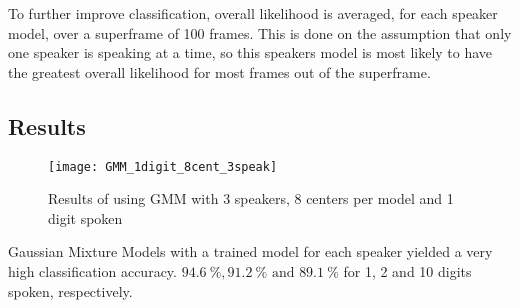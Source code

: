 To further improve classification, overall likelihood is averaged, for each speaker model, over a superframe of 100 frames.
This is done on the assumption that only one speaker is speaking at a time, so this speakers model is most likely to have the greatest overall likelihood for most frames out of the superframe.

\subsection*{Results}
\begin{figure}[H]
\centering
\texttt{[image: GMM\_1digit\_8cent\_3speak]}
\caption{Results of using GMM with 3 speakers, 8 centers per model and 1 digit spoken}
\label{fig:GMM_fig_1}
\end{figure}

Gaussian Mixture Models with a trained model for each speaker yielded a very high classification accuracy. $  94.6\ \%, 91.2\ \% \text{ and }  89.1\ \% $ for 1, 2 and 10 digits spoken, respectively.



